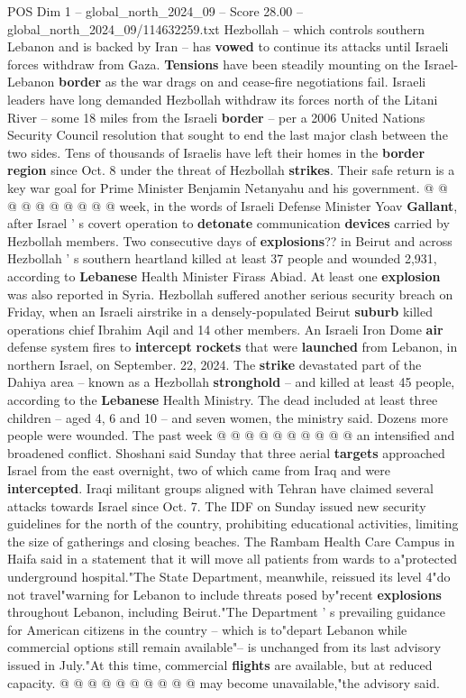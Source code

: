 \begin{textsample}{POS Dim 1 – global\_north\_2024\_09 – Score 28.00 – global\_north\_2024\_09/114632259.txt}
Hezbollah -- which controls southern Lebanon and is backed by Iran -- has \textbf{vowed} to continue its attacks until Israeli forces withdraw from Gaza. \textbf{Tensions} have been steadily mounting on the Israel-Lebanon \textbf{border} as the war drags on and cease-fire negotiations fail.
Israeli leaders have long demanded Hezbollah withdraw its forces north of the Litani River -- some 18 miles from the Israeli \textbf{border} -- per a 2006 United Nations Security Council resolution that sought to end the last major clash between the two sides.
Tens of thousands of Israelis have left their homes in the \textbf{border} \textbf{region} since Oct. 8 under the threat of Hezbollah \textbf{strikes}.
Their safe return is a key war goal for Prime Minister Benjamin Netanyahu and his government. @ @ @ @ @ @ @ @ @ @ week, in the words of Israeli Defense Minister Yoav \textbf{Gallant}, after Israel ' s covert operation to \textbf{detonate} communication \textbf{devices} carried by Hezbollah members.
Two consecutive days of \textbf{explosions}?? in Beirut and across Hezbollah ' s southern heartland killed at least 37 people and wounded 2,931, according to \textbf{Lebanese} Health Minister Firass Abiad.
At least one \textbf{explosion} was also reported in Syria.
Hezbollah suffered another serious security breach on Friday, when an Israeli airstrike in a densely-populated Beirut \textbf{suburb} killed operations chief Ibrahim Aqil and 14 other members.
An Israeli Iron Dome \textbf{air} defense system fires to \textbf{intercept} \textbf{rockets} that were \textbf{launched} from Lebanon, in northern Israel, on September. 22, 2024.
The \textbf{strike} devastated part of the Dahiya area -- known as a Hezbollah \textbf{stronghold} -- and killed at least 45 people, according to the \textbf{Lebanese} Health Ministry.
The dead included at least three children -- aged 4, 6 and 10 -- and seven women, the ministry said.
Dozens more people were wounded.
The past week @ @ @ @ @ @ @ @ @ @ an intensified and broadened conflict.
Shoshani said Sunday that three aerial \textbf{targets} approached Israel from the east overnight, two of which came from Iraq and were \textbf{intercepted}.
Iraqi militant groups aligned with Tehran have claimed several attacks towards Israel since Oct. 7.
The IDF on Sunday issued new security guidelines for the north of the country, prohibiting educational activities, limiting the size of gatherings and closing beaches.
The Rambam Health Care Campus in Haifa said in a statement that it will move all patients from wards to a"protected underground hospital."The State Department, meanwhile, reissued its level 4"do not travel"warning for Lebanon to include threats posed by"recent \textbf{explosions} throughout Lebanon, including Beirut."The Department ' s prevailing guidance for American citizens in the country -- which is to"depart Lebanon while commercial options still remain available"-- is unchanged from its last advisory issued in July."At this time, commercial \textbf{flights} are available, but at reduced capacity. @ @ @ @ @ @ @ @ @ @ may become unavailable,"the advisory said.

\end{textsample}
